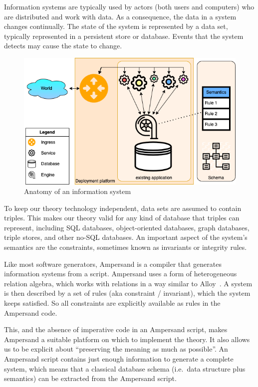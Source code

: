 \documentclass[runningheads]{llncs}
\begin{document}
   Information systems are typically used by actors (both users and computers) who are distributed and work with data.
   As a consequence, the data in a system changes continually.
   The state of the system is represented by a data set, typically represented in a persistent store or database.
   Events that the system detects may cause the state to change.
\begin{figure}[bht]
   \begin{center}
     \includegraphics[scale=.45]{figures/datamigration-Pre-migration.png}
   \end{center}
\caption{Anatomy of an information system}
\label{fig:pre-migration}
\end{figure}
   To keep our theory technology independent, data sets are assumed to contain triples.
   This makes our theory valid for any kind of database that triples can represent,
   including SQL databases, object-oriented databases, graph databases, triple stores, and other no-SQL databases.
   An important aspect of the system's semantics are the constraints, sometimes known as invariants or integrity rules.

   Like most software generators, Ampersand is a compiler that generates information systems from a script.
   Ampersand uses a form of heterogeneous relation algebra,
   which works with relations in a way similar to Alloy~\cite{Alloy2006}.
   A system is then described by a set of rules (aka constraint / invariant), which the system keeps satisfied.
   So all constraints are explicitly available as rules in the Ampersand code.

   This, and the absence of imperative code in an Ampersand script, makes Ampersand a suitable platform on which to implement the theory.
   It also allows us to be explicit about ``preserving the meaning as much as possible''.
   An Ampersand script contains just enough information to generate a complete system,
   which means that a classical database schema (i.e.\ data structure plus semantics) can be extracted from the Ampersand script.
\end{document}
